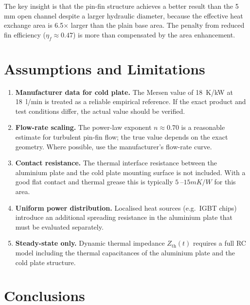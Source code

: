 \documentclass[a4paper,11pt]{article}
\begin{document}
The key insight is that the pin-fin structure achieves a better result than the
5\,mm open channel despite a larger hydraulic diameter, because the effective heat
exchange area is 6.5$\times$ larger than the plain base area. The penalty from
reduced fin efficiency ($\eta_f \approx 0.47$) is more than compensated by the
area enhancement.

\section{Assumptions and Limitations}

\begin{enumerate}
  \item \textbf{Manufacturer data for cold plate.} The Mersen value of
        \SI{18}{K/kW} at \SI{18}{l/min} is treated as a reliable empirical
        reference. If the exact product and test conditions differ, the actual
        value should be verified.
  \item \textbf{Flow-rate scaling.} The power-law exponent $n \approx 0.70$ is
        a reasonable estimate for turbulent pin-fin flow; the true value depends on
        the exact geometry. Where possible, use the manufacturer's flow-rate curve.
  \item \textbf{Contact resistance.} The thermal interface resistance between the
        aluminium plate and the cold plate mounting surface is not included. With
        a good flat contact and thermal grease this is typically
        $\SI{5}{\text{--}15}{mK/W}$ for this area.
  \item \textbf{Uniform power distribution.} Localised heat sources (e.g.\ IGBT
        chips) introduce an additional spreading resistance in the aluminium plate
        that must be evaluated separately.
  \item \textbf{Steady-state only.} Dynamic thermal impedance $Z_{\mathrm{th}}(t)$
        requires a full RC model including the thermal capacitances of the aluminium
        plate and the cold plate structure.
\end{enumerate}

\section{Conclusions}
\end{document}
